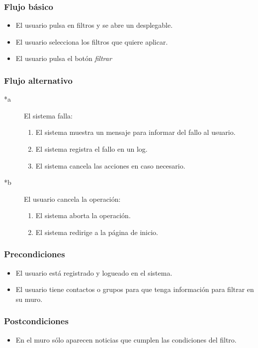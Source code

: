 \documentclass[12pt, a4paper, titlepage]{article}
\begin{document}
\subsubsection{Flujo básico}
	\begin{itemize}
		\item El usuario pulsa en filtros y se abre un desplegable.
		\item El usuario selecciona los filtros que quiere aplicar.
		\item El usuario pulsa el botón \textit{filtrar}
	\end{itemize}
\subsubsection{Flujo alternativo}

	\begin{description}
	\item [*a] El sistema falla:
	\begin{enumerate}
		\item El sistema muestra un mensaje para informar del fallo al usuario.
		\item El sistema registra el fallo en un log.
		\item El sistema cancela las acciones en caso necesario.
	\end{enumerate}
\end{description}

\begin{description}
	\item [*b] El usuario cancela la operación:
	\begin{enumerate}
		\item El sistema aborta la operación.
		\item El sistema redirige a la página de inicio.
	\end{enumerate}
\end{description}

\subsubsection{Precondiciones}
	\begin{itemize}
		\item El usuario está registrado y logueado en el sistema.
		\item El usuario tiene contactos o grupos para que tenga información para filtrar en su muro.
	\end{itemize}
\subsubsection{Postcondiciones}
	\begin{itemize}
		\item En el muro sólo aparecen noticias que cumplen las condiciones del filtro.
	\end{itemize}
\end{document}
